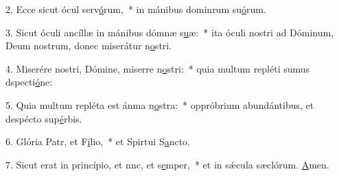 2. Ecce sicut ócul serv\uline{ó}rum,~* in mánibus dominrum su\uline{ó}rum.\par 
3. Sicut óculi ancíllæ in mánibus dómnæ s\uline{u}æ:~* ita óculi nostri ad Dóminum, Deum nostrum, donec miserátur n\uline{o}stri.\par 
4. Miserére nostri, Dómine, miserre n\uline{o}stri:~* quia multum repléti sumus dspecti\uline{ó}ne:\par 
5. Quia multum repléta est ánma n\uline{o}stra:~* oppróbrium abundántibus, et despécto sup\uline{é}rbis.\par 
6. Glória Patr, et F\uline{í}lio,~* et Spirtui S\uline{a}ncto.\par 
7. Sicut erat in princípio, et nnc, et s\uline{e}mper,~* et in sǽcula sæclórum. \uline{A}men.\par 
